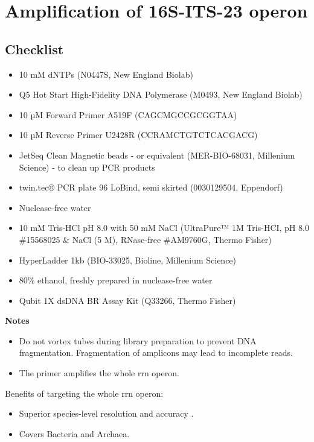 \documentclass[
]{book}
\providecommand{\tightlist}{%
  \setlength{\itemsep}{0pt}\setlength{\parskip}{0pt}}
\begin{document}
\section{Amplification of 16S-ITS-23 operon}\label{amplification-of-16s-its-23-operon}

\subsection{Checklist}\label{checklist-1}

\begin{itemize}
\tightlist
\item
  10 mM dNTPs (N0447S, New England Biolab)
\item
  Q5 Hot Start High-Fidelity DNA Polymerase (M0493, New England Biolab)
\item
  10 µM Forward Primer A519F (CAGCMGCCGCGGTAA) \citep{Martijn2019}
\item
  10 µM Reverse Primer U2428R (CCRAMCTGTCTCACGACG) \citep{Martijn2019}
\item
  JetSeq Clean Magnetic beads - or equivalent (MER-BIO-68031, Millenium Science) - to clean up PCR products
\item
  twin.tec® PCR plate 96 LoBind, semi skirted (0030129504, Eppendorf)
\item
  Nuclease-free water
\item
  10 mM Tris-HCl pH 8.0 with 50 mM NaCl (UltraPure™ 1M Tris-HCI, pH 8.0 \#15568025 \& NaCl (5 M), RNase-free \#AM9760G, Thermo Fisher)
\item
  HyperLadder 1kb (BIO-33025, Bioline, Millenium Science)
\item
  80\% ethanol, freshly prepared in nuclease-free water
\item
  Qubit 1X dsDNA BR Assay Kit (Q33266, Thermo Fisher)
\end{itemize}

\textbf{Notes}

\begin{itemize}
\tightlist
\item
  Do not vortex tubes during library preparation to prevent DNA fragmentation. Fragmentation of amplicons may lead to incomplete reads.
\item
  The primer amplifies the whole rrn operon.
\end{itemize}

Benefits of targeting the whole rrn operon:

\begin{itemize}
\tightlist
\item
  Superior species-level resolution and accuracy \citep{Cusco2018, Srinivas2024}.
\item
  Covers Bacteria and Archaea.
\end{itemize}
\end{document}
